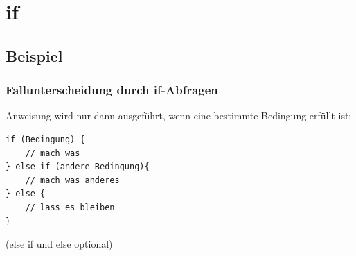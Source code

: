 \documentclass[final]{beamer}
\begin{document}


\section{if}
\subsection{Beispiel}
\begin{frame}[containsverbatim]
	\frametitle{Fallunterscheidung durch if-Abfragen}
	Anweisung wird nur dann ausgeführt, wenn eine bestimmte Bedingung erfüllt ist:
	\begin{lstlisting}
if (Bedingung) {
	// mach was
} else if (andere Bedingung){
	// mach was anderes
} else {
	// lass es bleiben
}
	\end{lstlisting}
	(else if und else optional)
\end{frame}
\end{document}
